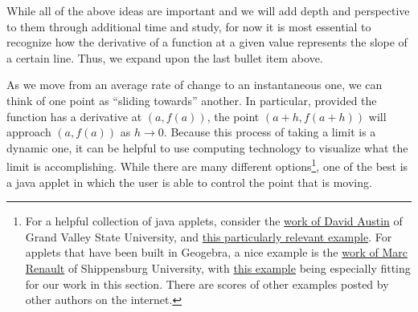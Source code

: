 \documentclass[10pt,]{book}
\theoremstyle{plain}
\theoremstyle{definition}
\theoremstyle{definition}
\theoremstyle{definition}
\theoremstyle{definition}
\theoremstyle{definition}
\numberwithin{equation}{section}
\begin{document}
While all of the above ideas are important and we will add depth and perspective to them through additional time and study, for now it is most essential to recognize how the derivative of a function at a given value represents the slope of a certain line. Thus, we expand upon the last bullet item above.
%
\par

As we move from an average rate of change to an instantaneous one, we can think of one point as ``sliding towards'' another. In particular, provided the function has a derivative at \((a,f(a))\), the point \((a+h,f(a+h))\) will approach \((a,f(a))\) as \(h \to 0\). Because this process of taking a limit is a dynamic one, it can be helpful to use computing technology to visualize what the limit is accomplishing. While there are many different options\footnote{For a helpful collection of java applets, consider the \href{http://gvsu.edu/s/5r}{work of David Austin} of Grand Valley State University, and \href{http://gvsu.edu/s/5s}{this particularly relevant example}.  For applets that have been built in Geogebra, a nice example is the \href{http://gvsu.edu/s/5p}{work of Marc Renault} of Shippensburg University, with \href{http://gvsu.edu/s/5q}{this example} being especially fitting for our work in this section.  There are scores of other examples posted by other authors on the internet.\label{fn-3}}, one of the best is a java applet in which the user is able to control the point that is moving.  %
%
\par
\end{document}

